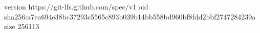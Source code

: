 version https://git-lfs.github.com/spec/v1
oid sha256:a7ea694e38bc37293c5565c893b039b14bb558bd960bf8fdd2bbf2747284239a
size 256113
